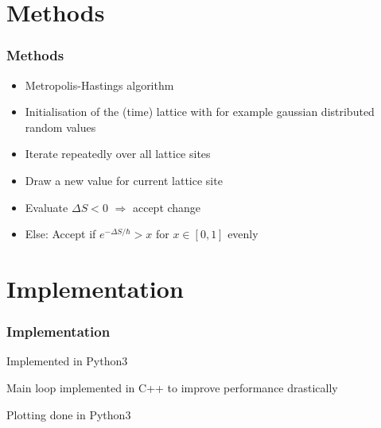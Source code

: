 \documentclass[aspectratio=169]{beamer}
\begin{document}
\section{Methods}
\begin{frame}
	\frametitle{Methods}
	\begin{itemize}
		\item Metropolis-Hastings algorithm
		\item Initialisation of the (time) lattice with for example gaussian distributed random values
		\item Iterate repeatedly over all lattice sites
		\item Draw a new value for current lattice site
		\item Evaluate $\Delta S < 0$ $\Rightarrow$ accept change
		\item Else: Accept if $e^{-\Delta S / \hbar} > x$ for $x \in [0, 1]$ evenly
	\end{itemize}
\end{frame}


\section{Implementation}
\begin{frame}
	\frametitle{Implementation}
	\begin{myitemize}
		\item Implemented in Python3
		\item Main loop implemented in C++ to improve performance drastically
		\item Plotting done in Python3
	\end{myitemize}
\end{frame}
\end{document}
